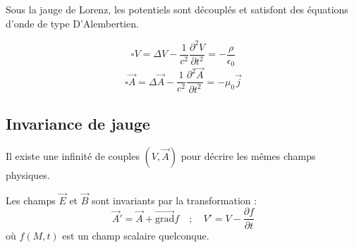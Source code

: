 \documentclass[french]{yLectureNote}
\renewcommand{\vec}{\overrightarrow}
\newcommand{\grad}{\vec{\mathrm{grad}}}
\begin{document}
Sous la jauge de Lorenz, les potentiels sont découplés et satisfont des équations d'onde de type D'Alembertien.

\begin{theorem}
    $$\square V = \Delta V - \frac{1}{c^2}\frac{\partial^2 V}{\partial t^2} = -\frac{\rho}{\epsilon_0}$$
    $$\square \vec{A} = \Delta \vec{A} - \frac{1}{c^2}\frac{\partial^2 \vec{A}}{\partial t^2} = -\mu_0 \vec{j}$$
\end{theorem}

\subsection{Invariance de jauge}
Il existe une infinité de couples $(V, \vec{A})$ pour décrire les mêmes champs physiques.

\begin{theorem}
    Les champs $\vec{E}$ et $\vec{B}$ sont invariants par la transformation :
    $$\vec{A}' = \vec{A} + \grad f \quad ; \quad V' = V - \frac{\partial f}{\partial t}$$
    où $f(M,t)$ est un champ scalaire quelconque.
\end{theorem}
\end{document}

